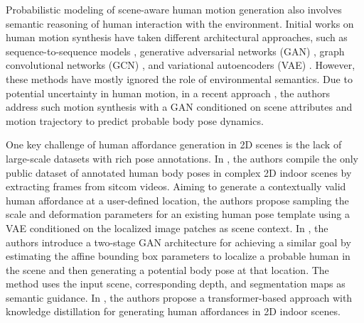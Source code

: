 Probabilistic modeling of scene-aware human motion generation also involves semantic reasoning of human interaction with the environment. Initial works on human motion synthesis have taken different architectural approaches, such as sequence-to-sequence models \cite{barsoum2018hp}, generative adversarial networks (GAN) \cite{barsoum2018hp, cai2018deep, yang2018pose}, graph convolutional networks (GCN) \cite{yan2019convolutional}, and variational autoencoders (VAE) \cite{guo2020action2motion}. However, these methods have mostly ignored the role of environmental semantics. Due to potential uncertainty in human motion, in a recent approach \cite{wang2021scene}, the authors address such motion synthesis with a GAN conditioned on scene attributes and motion trajectory to predict probable body pose dynamics.

One key challenge of human affordance generation in 2D scenes is the lack of large-scale datasets with rich pose annotations. In \cite{wang2017binge}, the authors compile the only public dataset of annotated human body poses in complex 2D indoor scenes by extracting frames from sitcom videos. Aiming to generate a contextually valid human affordance at a user-defined location, the authors propose sampling the scale and deformation parameters for an existing human pose template using a VAE conditioned on the localized image patches as scene context. In \cite{zhang2022inpaint}, the authors introduce a two-stage GAN architecture for achieving a similar goal by estimating the affine bounding box parameters to localize a probable human in the scene and then generating a potential body pose at that location. The method uses the input scene, corresponding depth, and segmentation maps as semantic guidance. In \cite{yao2023scene}, the authors propose a transformer-based approach with knowledge distillation for generating human affordances in 2D indoor scenes.

